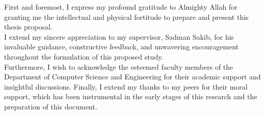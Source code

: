 First and foremost, I express my profound gratitude to Almighty Allah for granting me the intellectual and physical fortitude to prepare and present this thesis proposal.\\

I extend my sincere appreciation to my supervisor, Sadman Sakib, for his invaluable guidance, constructive feedback, and unwavering encouragement throughout the formulation of this proposed study.\\

Furthermore, I wish to acknowledge the esteemed faculty members of the Department of Computer Science and Engineering for their academic support and insightful discussions. Finally, I extend my thanks to my peers for their moral support, which has been instrumental in the early stages of this research and the preparation of this document.